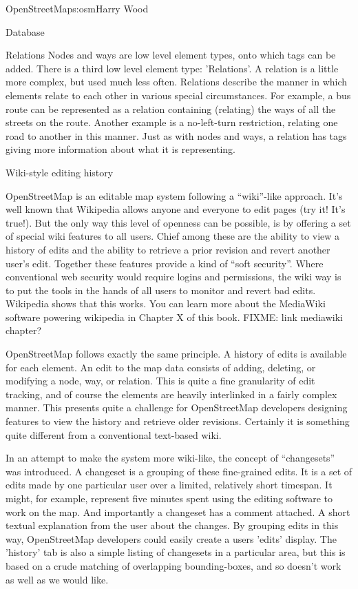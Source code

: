 \begin{aosachapter}{OpenStreetMap}{s:osm}{Harry Wood}
\begin{aosasect1}{Database}
\begin{aosasect2}{Relations}
Nodes and ways are low level element types, onto which tags can be
added. There is a third low level element type: 'Relations'. A
relation is a little more complex, but used much less often. Relations
describe the manner in which elements relate to each other in various
special circumstances. For example, a bus route can be represented as
a relation containing (relating) the ways of all the streets on the
route. Another example is a no-left-turn restriction, relating one
road to another in this manner. Just as with nodes and ways, a
relation has tags giving more information about what it is
representing.

\end{aosasect2}

\begin{aosasect2}{Wiki-style editing history}

OpenStreetMap is an editable map system following a ``wiki''-like
approach. It's well known that Wikipedia allows anyone and everyone to
edit pages (try it! It's true!). But the only way this level of
openness can be possible, is by offering a set of special wiki
features to all users. Chief among these are the ability to view a
history of edits and the ability to retrieve a prior revision and
revert another user's edit. Together these features provide a kind of
``soft security''. Where conventional web security would require
logins and permissions, the wiki way is to put the tools in the hands
of all users to monitor and revert bad edits. Wikipedia shows that
this works. You can learn more about the MediaWiki software powering
wikipedia in Chapter X of this book. FIXME: link mediawiki chapter?

OpenStreetMap follows exactly the same principle. A history of edits
is available for each element. An edit to the map data consists of
adding, deleting, or modifying a node, way, or relation. This is quite
a fine granularity of edit tracking, and of course the elements are
heavily interlinked in a fairly complex manner. This presents quite a
challenge for OpenStreetMap developers designing features to view the
history and retrieve older revisions. Certainly it is something quite
different from a conventional text-based wiki.

In an attempt to make the system more wiki-like, the concept of
``changesets'' was introduced. A changeset is a grouping of these
fine-grained edits. It is a set of edits made by one particular user
over a limited, relatively short timespan. It might, for example,
represent five minutes spent using the editing software to work on the
map. And importantly a changeset has a comment attached. A short
textual explanation from the user about the changes. By grouping edits
in this way, OpenStreetMap developers could easily create a users
'edits' display. The 'history' tab is also a simple listing of
changesets in a particular area, but this is based on a crude matching
of overlapping bounding-boxes, and so doesn't work as well as we would
like.


\end{aosasect2}
\end{aosasect1}
\end{aosachapter}
